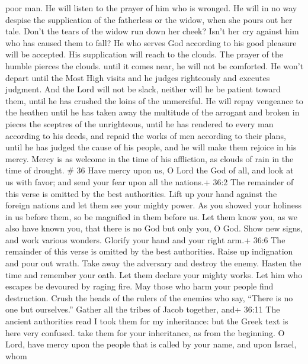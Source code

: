 poor man. He will listen to the prayer of him who is wronged.
 He will in no way despise the supplication of the
fatherless or the widow, when she pours out her tale. 
Don't the tears of the widow run down her cheek? Isn't her cry against
him who has caused them to fall?  He who serves God
according to his good pleasure will be accepted. His supplication will
reach to the clouds.  The prayer of the humble pierces the
clouds. until it comes near, he will not be comforted. He won't depart
until the Most High visits and he judges righteously and executes
judgment.  And the Lord will not be slack, neither will he
be patient toward them, until he has crushed the loins of the
unmerciful. He will repay vengeance to the heathen until he has taken
away the multitude of the arrogant and broken in pieces the sceptres of
the unrighteous,  until he has rendered to every man
according to his deeds, and repaid the works of men according to their
plans, until he has judged the cause of his people, and he will make
them rejoice in his mercy.  Mercy is as welcome in the time
of his affliction, as clouds of rain in the time of drought. \# 36
 Have mercy upon us, O Lord the God of all, and look at us
with favor;  and send your fear upon all the nations.+ 36:2
The remainder of this verse is omitted by the best authorities.
 Lift up your hand against the foreign nations and let them
see your mighty power.  As you showed your holiness in us
before them, so be magnified in them before us.  Let them
know you, as we also have known you, that there is no God but only you,
O God.  Show new signs, and work various wonders. Glorify
your hand and your right arm.+ 36:6 The remainder of this verse is
omitted by the best authorities.  Raise up indignation and
pour out wrath. Take away the adversary and destroy the enemy.
 Hasten the time and remember your oath. Let them declare
your mighty works.  Let him who escapes be devoured by
raging fire. May those who harm your people find destruction.
 Crush the heads of the rulers of the enemies who say,
``There is no one but ourselves.''  Gather all the tribes
of Jacob together, and+ 36:11 The ancient authorities read I took them
for my inheritance: but the Greek text is here very confused. take them
for your inheritance, as from the beginning.  O Lord, have
mercy upon the people that is called by your name, and upon Israel, whom
